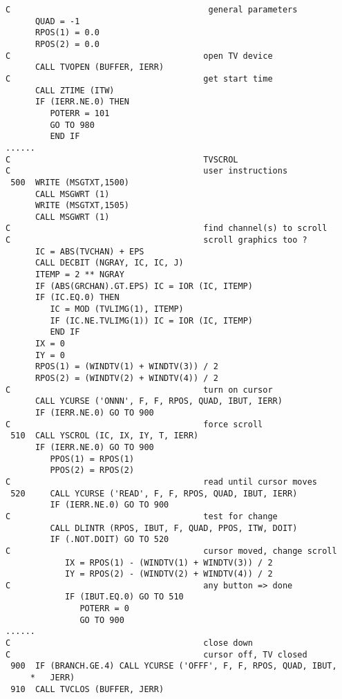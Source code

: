 \begin{verbatim}
C                                        general parameters
      QUAD = -1
      RPOS(1) = 0.0
      RPOS(2) = 0.0
C                                       open TV device
      CALL TVOPEN (BUFFER, IERR)
C                                       get start time
      CALL ZTIME (ITW)
      IF (IERR.NE.0) THEN
         POTERR = 101
         GO TO 980
         END IF
......
C                                       TVSCROL
C                                       user instructions
 500  WRITE (MSGTXT,1500)
      CALL MSGWRT (1)
      WRITE (MSGTXT,1505)
      CALL MSGWRT (1)
C                                       find channel(s) to scroll
C                                       scroll graphics too ?
      IC = ABS(TVCHAN) + EPS
      CALL DECBIT (NGRAY, IC, IC, J)
      ITEMP = 2 ** NGRAY
      IF (ABS(GRCHAN).GT.EPS) IC = IOR (IC, ITEMP)
      IF (IC.EQ.0) THEN
         IC = MOD (TVLIMG(1), ITEMP)
         IF (IC.NE.TVLIMG(1)) IC = IOR (IC, ITEMP)
         END IF
      IX = 0
      IY = 0
      RPOS(1) = (WINDTV(1) + WINDTV(3)) / 2
      RPOS(2) = (WINDTV(2) + WINDTV(4)) / 2
C                                       turn on cursor
      CALL YCURSE ('ONNN', F, F, RPOS, QUAD, IBUT, IERR)
      IF (IERR.NE.0) GO TO 900
C                                       force scroll
 510  CALL YSCROL (IC, IX, IY, T, IERR)
      IF (IERR.NE.0) GO TO 900
         PPOS(1) = RPOS(1)
         PPOS(2) = RPOS(2)
C                                       read until cursor moves
 520     CALL YCURSE ('READ', F, F, RPOS, QUAD, IBUT, IERR)
         IF (IERR.NE.0) GO TO 900
C                                       test for change
         CALL DLINTR (RPOS, IBUT, F, QUAD, PPOS, ITW, DOIT)
         IF (.NOT.DOIT) GO TO 520
C                                       cursor moved, change scroll
            IX = RPOS(1) - (WINDTV(1) + WINDTV(3)) / 2
            IY = RPOS(2) - (WINDTV(2) + WINDTV(4)) / 2
C                                       any button => done
            IF (IBUT.EQ.0) GO TO 510
               POTERR = 0
               GO TO 900
......
C                                       close down
C                                       cursor off, TV closed
 900  IF (BRANCH.GE.4) CALL YCURSE ('OFFF', F, F, RPOS, QUAD, IBUT,
     *   JERR)
 910  CALL TVCLOS (BUFFER, JERR)
\end{verbatim}

